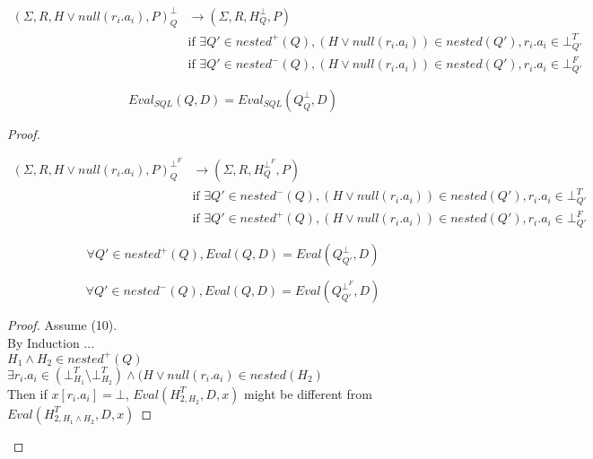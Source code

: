 \begin{mydef}
	\begin{align*}
		(\Sigma,R,H \lor null(r_i.a_i),P)^\bot_Q & \rightarrow (\Sigma,R,H^\bot_{Q},P) \\
		& \mbox{if } \exists Q' \in nested^+(Q), (H\lor null(r_i.a_i)) \in nested(Q'), r_i.a_i \in \bot^T_{Q'} \\
		& \mbox{if } \exists Q' \in nested^-(Q), (H\lor null(r_i.a_i)) \in nested(Q'), r_i.a_i \in \bot^F_{Q'}
	\end{align*}
\end{mydef}



\begin{myprop}
	$$Eval_{SQL}(Q,D) = Eval_{SQL}(Q^\bot_Q,D)$$
\end{myprop}

\begin{proof}
	
	\begin{mydef}
		\begin{align*}
			(\Sigma,R,H \lor null(r_i.a_i),P)^{\bot^F}_Q & \rightarrow (\Sigma,R,H^{\bot^F}_{Q},P) \\
			& \mbox{if } \exists Q' \in nested^-(Q), (H\lor null(r_i.a_i)) \in nested(Q'), r_i.a_i \in \bot^T_{Q'} \\
			& \mbox{if } \exists Q' \in nested^+(Q), (H\lor null(r_i.a_i)) \in nested(Q'), r_i.a_i \in \bot^F_{Q'}
		\end{align*}
	\end{mydef}
	
	\begin{myprop}
		$$\forall Q' \in nested^+(Q), Eval(Q,D) = Eval(Q^\bot_{Q'},D)$$
	\end{myprop}
	\begin{myprop}
		$$\forall Q' \in nested^-(Q), Eval(Q,D) = Eval(Q^{\bot^F}_{Q'},D)$$
	\end{myprop}
	
	\begin{proof}
		Assume (10).
		\\By Induction ...
		\\$H_1 \land H_2 \in nested^+(Q)$
		\\$\exists r_i.a_i \in (\bot^T_{H_1} \setminus \bot^T_{H_2}) \land (H\lor null(r_i.a_i)\in nested(H_2)$
		\\Then if $x[r_i.a_i] = \bot$, $Eval(H^T_{2,H_2},D,x)$ might be different from $Eval(H^T_{2,H_1\land H_2},D,x)$
	\end{proof}
	
	
\end{proof}

\begin{myprop}
	
\end{myprop}
